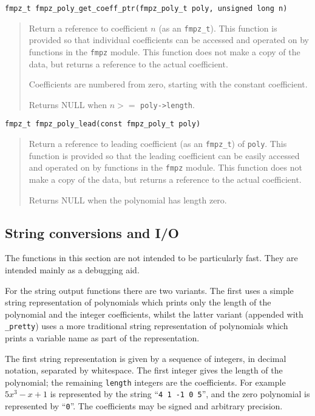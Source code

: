 \documentclass[a4paper,10pt]{article}
\newcommand{\code}{\lstinline}
\begin{document}
\begin{lstlisting}
fmpz_t fmpz_poly_get_coeff_ptr(fmpz_poly_t poly, unsigned long n)
\end{lstlisting}
\begin{quote}
Return a reference to coefficient $n$ (as an \code{fmpz_t}). This function is provided so that individual coefficients can be accessed and operated on by functions in the \code{fmpz} module. This function does not make a copy of the data, but returns a reference to the actual coefficient.

Coefficients are numbered from zero, starting with the constant coefficient. 

Returns NULL when $n >= $ \code{poly->length}. 
\end{quote}

\begin{lstlisting}
fmpz_t fmpz_poly_lead(const fmpz_poly_t poly)
\end{lstlisting}
\begin{quote}
Return a reference to leading coefficient (as an \code{fmpz_t}) of \code{poly}. This function is provided so that the leading coefficient can be easily accessed and operated on by functions in the \code{fmpz} module. This function does not make a copy of the data, but returns a reference to the actual coefficient.

Returns NULL when the polynomial has length zero. 
\end{quote}

\subsection{String conversions and I/O}

The functions in this section are not intended to be particularly fast. They are intended mainly as a debugging aid.

For the string output functions there are two variants. The first uses a simple string representation of polynomials which prints only the length of the polynomial and the integer coefficients, whilst the latter variant (appended with \code{_pretty}) uses a more traditional string representation of polynomials which prints a variable name as part of the representation. 

The first string representation is given by a sequence of integers, in decimal notation, separated by whitespace. The first integer gives the length of the polynomial; the remaining \code{length} integers are the coefficients. For example $5x^3 - x + 1$ is represented by the string ``\code{4 1 -1 0 5}'', and the zero polynomial is represented by ``\code{0}''. The coefficients may be signed and arbitrary precision.
\end{document}
